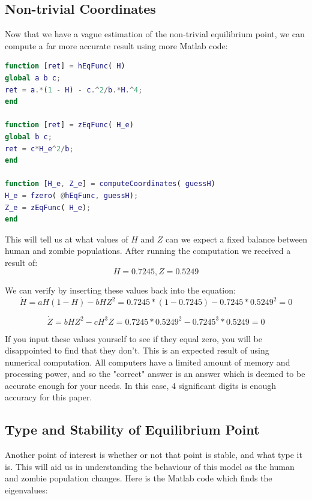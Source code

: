 \documentclass[11pt]{article}
\begin{document}
\subsection{ Non-trivial Coordinates}
Now that we have a vague estimation of the non-trivial equilibrium point, we can compute a far more accurate result using more Matlab code:

\begin{lstlisting}[language = Matlab]
function [ret] = hEqFunc( H)
global a b c;
ret = a.*(1 - H) - c.^2/b.*H.^4;
end

function [ret] = zEqFunc( H_e)
global b c;
ret = c*H_e^2/b;
end

function [H_e, Z_e] = computeCoordinates( guessH)
H_e = fzero( @hEqFunc, guessH);
Z_e = zEqFunc( H_e);
end
\end{lstlisting}

This will tell us at what values of $H$ and $Z$ can we expect a fixed balance between human and zombie populations. After running the computation we received a result of:
\begin{equation}
H = 0.7245, Z = 0.5249
\end{equation}

We can verify by inserting these values back into the equation:
\begin{equation}
\dot{H} = aH(1 - H) - bHZ^2 = 0.7245*(1 - 0.7245) - 0.7245*0.5249^2 = 0
\end{equation}

\begin{equation}
\dot{Z} = bHZ^2 - cH^3Z = 0.7245*0.5249^2 - 0.7245^3*0.5249 = 0
\end{equation}

If you input these values yourself to see if they equal zero, you will be disappointed to find that they don't. This is an expected result of using numerical computation. All computers have a limited amount of memory and processing power, and so the "correct" answer is an answer which is deemed to be accurate enough for your needs. In this case, 4 significant digits is enough accuracy for this paper.

\subsection{ Type and Stability of Equilibrium Point}
Another point of interest is whether or not that point is stable, and what type it is. This will aid us in understanding the behaviour of this model as the human and zombie population changes. Here is the Matlab code which finds the eigenvalues:
\end{document}
